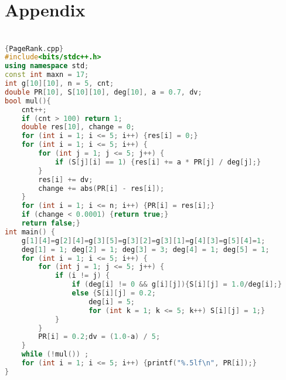 \documentclass[12pt]{article}
\newcommand{\hiddensection}[1]{
\stepcounter{section}
\section*{\Roman {section} \hspace{1em}{#1}}}
\begin{document}
{\section*{Appendix}
\appendix
\hiddensection{Codes for Solving PageRank Values}
\begin{lstlisting}[language=C++]{PageRank.cpp}
#include<bits/stdc++.h>
using namespace std;
const int maxn = 17;
int g[10][10], n = 5, cnt;
double PR[10], S[10][10], deg[10], a = 0.7, dv;
bool mul(){
    cnt++;
    if (cnt > 100) return 1;
    double res[10], change = 0;
    for (int i = 1; i <= 5; i++) {res[i] = 0;}
    for (int i = 1; i <= 5; i++) {
        for (int j = 1; j <= 5; j++) {
            if (S[j][i] == 1) {res[i] += a * PR[j] / deg[j];}
        }
        res[i] += dv;
        change += abs(PR[i] - res[i]);
    }
    for (int i = 1; i <= n; i++) {PR[i] = res[i];}
    if (change < 0.0001) {return true;}
    return false;}
int main() {
    g[1][4]=g[2][4]=g[3][5]=g[3][2]=g[3][1]=g[4][3]=g[5][4]=1;
    deg[1] = 1; deg[2] = 1; deg[3] = 3; deg[4] = 1; deg[5] = 1;
    for (int i = 1; i <= 5; i++) {
        for (int j = 1; j <= 5; j++) {
            if (i != j) {
                if (deg[i] != 0 && g[i][j]){S[i][j] = 1.0/deg[i];}
                else {S[i][j] = 0.2;
                    deg[i] = 5;
                    for (int k = 1; k <= 5; k++) S[i][j] = 1;}
            }
        }
        PR[i] = 0.2;dv = (1.0-a) / 5;
    }
    while (!mul()) ;
    for (int i = 1; i <= 5; i++) {printf("%.5lf\n", PR[i]);}
}
\end{lstlisting}
\clearpage
\hiddensection{Codes for Factor Analysis (Key Part)}
}
\end{document}
